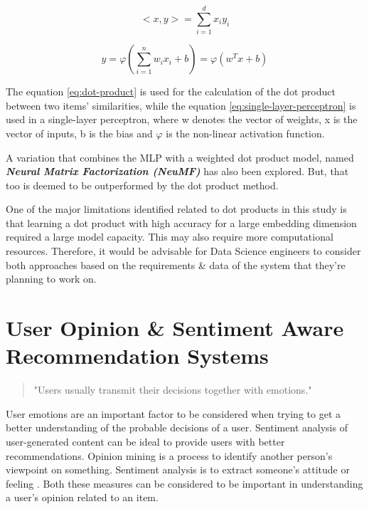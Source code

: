 \documentclass[manuscript,screen,review]{acmart}
\begin{document}
\begin{equation}
<x,y>  = \sum_{i=1}^{d}x_{i}y_{i}\label{eq:dot-product}
\end{equation}

\begin{equation}
y = \varphi(\sum_{i=1}^{n}w_{i}x_{i}+b) = \varphi(w^{T}x+b)\label{eq:single-layer-perceptron}
\end{equation}

The equation \ref{eq:dot-product} is used for the calculation of the dot product between two items' similarities, while the equation \ref{eq:single-layer-perceptron} is used in a single-layer perceptron, where w denotes the vector of weights, x is the vector of inputs, b is the bias and $\varphi$ is the non-linear activation function.

A variation that combines the MLP with a weighted dot product model, named \textbf{\emph{Neural Matrix Factorization (NeuMF)}} has also been explored. But, that too is deemed to be outperformed by the dot product method.

One of the major limitations identified related to dot products in this study is that learning a dot product with high accuracy for a large embedding dimension required a large model capacity. This may also require more computational resources. Therefore, it would be advisable for Data Science engineers to consider both approaches based on the requirements \& data of the system that they're planning to work on.



\section{User Opinion \& Sentiment Aware Recommendation Systems}

\begin{quote} 
\centering 
"Users usually transmit their decisions together with emotions."\cite{chen_user_2019}
\end{quote}

User emotions are an important factor to be considered when trying to get a better understanding of the probable decisions of a user. Sentiment analysis of user-generated content can be ideal to provide users with better recommendations. Opinion mining is a process to identify another person's viewpoint on something. Sentiment analysis is to extract someone's attitude or feeling \cite{nah_opinion_2018}. Both these measures can be considered to be important in understanding a user's opinion related to an item.
\end{document}
